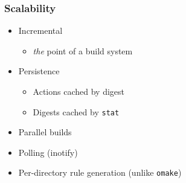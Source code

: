 \documentclass{beamer}
\begin{document}




%
%


\begin{frame}[fragile]
\frametitle{Scalability}
\begin{itemize}
\item Incremental 
\begin{itemize}
\item {\em the} point of a build system
\end{itemize}
\item Persistence
\begin{itemize}
\item Actions cached by digest
\item Digests cached by {\tt stat}
\end{itemize}
\item Parallel builds
\item Polling (inotify)
\item Per-directory rule generation (unlike {\tt omake})
\end{itemize}
\end{frame}
\end{document}
